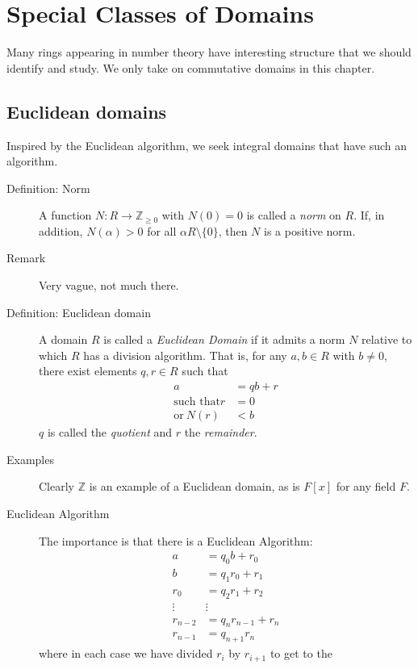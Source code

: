 \documentclass[12pt]{article}
\newcommand{\bbZ}{\mathbb{Z}}
\begin{document}
\section{Special Classes of Domains}
\label{sec:spec-class-doma} 

Many rings appearing in number theory have interesting structure that
we should identify and study. We only take on commutative domains in
this chapter.

\subsection{Euclidean domains}
\label{sec:euclidean-domains}

Inspired by the Euclidean algorithm, we seek integral domains that
have such an algorithm.   

\begin{description}
\item[Definition: Norm] A function $N: R\rightarrow \bbZ_{\geq 0}$
  with $N(0)=0$ is called a \emph{norm} on $R$. If, in addition,
  $N(\alpha)>0$ for all $\alpha R\setminus \{0\}$, then $N$ is a
  positive norm.
\item[Remark] Very vague, not much there. 
\item[Definition: Euclidean domain] A domain $R$ is called a
  \emph{Euclidean Domain} if it admits a norm $N$ relative to which
  $R$ has a division algorithm. That is, for any $a,b\in R$ with
  $b\neq 0$, there exist elements $q,r\in R$ such that
  \begin{align*}
    a&=qb+r\\
\textrm{such that} r &=0\\
\textrm{or}\ N(r) &<b
  \end{align*}
$q$ is called the \emph{quotient} and $r$ the \emph{remainder}.
\item[Examples] Clearly $\bbZ$ is an example of a Euclidean domain,
  as is $F[x]$ for any field $F$. 
\item[Euclidean Algorithm] The importance is that there is a
  Euclidean Algorithm:
  \begin{align*}
    a&=q_0b+r_0\\
    b&= q_1r_0+r_1\\
    r_0&=q_2r_1+r_2\\
    \vdots & \vdots\\
    r_{n-2} & =q_nr_{n-1}+r_n\\
r_{n-1}&= q_{n+1}r_n
  \end{align*}
where in each case we have divided $r_i$ by $r_{i+1}$ to get to the

\end{description}
\end{document}
